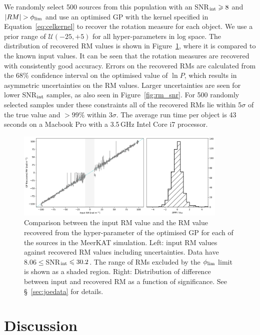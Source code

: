 \documentclass[fleqn,usenatbib]{mnras}
\begin{document}
We randomly select 500 sources from this population with an SNR$_{\rm int}\ge8$ and $|RM|>\phi_{\rm lim}$ and use an optimised GP with the kernel specified in Equation~\ref{eq:celkernel} to recover the rotation measure for each object. We use a prior range of $\mathcal{U}(-25,+5)$ for all hyper-parameters in log space.  The distribution of recovered RM values is shown in Figure~\ref{fig:survey}, where it is compared to the known input values. It can be seen that the rotation measures are recovered with consistently good accuracy. Errors on the recovered RMs are calculated from the 68\% confidence interval on the optimised value of $\ln P$, which results in asymmetric uncertainties on the RM values. Larger uncertainties are seen for lower SNR$_{\rm int}$ samples, as also seen in Figure~\ref{fig:rm_snr}. For 500 randomly selected samples under these constraints all of the recovered RMs lie within 5$\sigma$ of the true value and $>99\%$ within 3$\sigma$. The average run time per object is 43\,seconds on a Macbook Pro with a 3.5\,GHz Intel Core i7 processor.
%
\begin{figure}
\includegraphics[width=0.9\textwidth]{./FIGURES/rm_comp.png}
\caption{\label{fig:survey} Comparison between the input RM value and the RM value recovered from the hyper-parameter of the optimised GP for each of the sources in the MeerKAT simulation. Left: input RM values against recovered RM values including uncertainties. Data have $8.06 \le$SNR$_{\rm int} \le 30.2$. The range of RMs excluded by the $\phi_{\rm lim}$ limit is shown as a shaded region. Right: Distribution of difference between input and recovered RM as a function of significance. See \S~\ref{sec:joedata} for details.}
\end{figure}




\section{Discussion}
\label{sec:disc}
\end{document}

